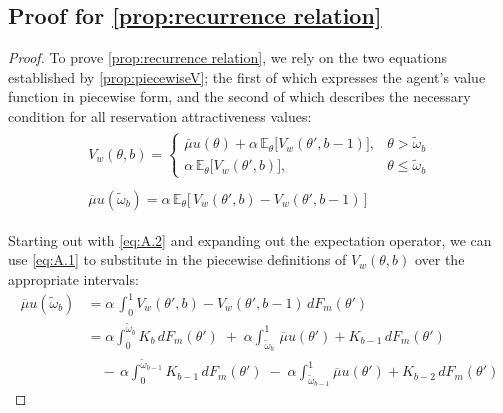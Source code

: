 \subsection{Proof for \autoref{prop:recurrence relation}} 
\begin{proof}
To prove \autoref{prop:recurrence relation}, we rely on the two equations established by \autoref{prop:piecewiseV}; the first of which expresses the agent's value function in piecewise form, and the second of which describes the necessary condition for all reservation attractiveness values: 
\begin{align}
    \begin{split}\label{eq:A.1}
        V_w(\theta, b)=\begin{cases} 
            \overline\mu u(\theta) + \alpha \,\mathbb{E}_{\theta}\Big[V_w(\theta', b-1)\Big],& \theta> \widetilde \omega_b \\[10pt]
            \alpha \,\mathbb{E}_{\theta}\Big[V_w(\theta', b)\Big],& \theta\leq\widetilde \omega_b
        \end{cases}
    \end{split}\\[10pt]
    \begin{split}\label{eq:A.2}
        \overline\mu u(\widetilde\omega_b) = \alpha \, \mathbb{E}_\theta\Big[\,V_w(\theta',b)-V_w(\theta',b-1)\,\Big] 
    \end{split} 
\end{align}  

Starting out with \autoref{eq:A.2} and expanding out the expectation operator, we can use \ref{eq:A.1} to substitute in the piecewise definitions of $V_w(\theta,b)$ over the appropriate intervals: 
\begin{equation}\label{eq:A.3}
    \begin{split}
        \overline\mu u(\widetilde\omega_b) &= \alpha \,\int^1_0 V_w(\theta',b)-V_w(\theta',b-1)\,dF_m(\theta')\\
                                           &=\alpha \int^{\widetilde\omega_b}_0 K_b\,dF_m(\theta') \;+\; \alpha \int^1_{\widetilde\omega_b}\,\overline\mu u(\theta') + K_{b-1}\,dF_m(\theta')\\ 
                                           & \quad -\,\alpha \int^{\widetilde\omega_{b-1}}_0 K_{b-1}\,dF_m(\theta') \;-\; \alpha \int^1_{\widetilde\omega_{b-1}} \overline\mu u(\theta') + K_{b-2}\,dF_m(\theta')
    \end{split}
\end{equation}


\end{proof}
